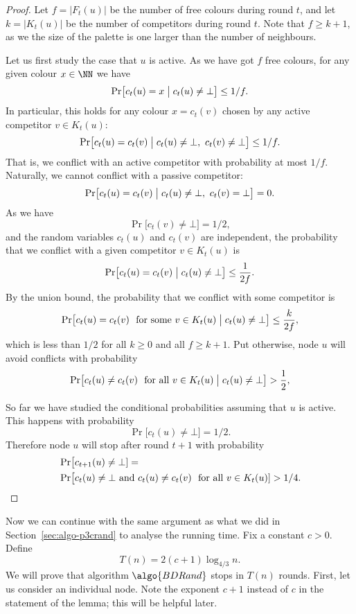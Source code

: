 \begin{proof}
    Let $f = |F_t(u)|$ be the number of free colours during round $t$, and let $k = |K_t(u)|$ be the number of competitors during round $t$. Note that $f \ge k + 1$, as we the size of the palette is one larger than the number of neighbours.

    Let us first study the case that $u$ is active. As we have got $f$ free colours, for any given colour $x \in \NN$ we have
    \[
        \Pr\bigl[ c_t(u) = x \bigm| c_t(u) \ne \bot \bigr] \le 1/f.
    \]
    In particular, this holds for any colour $x = c_t(v)$ chosen by any active competitor $v \in K_t(u)$:
    \[
        \Pr\bigl[ c_t(u) = c_t(v) \bigm| c_t(u) \ne \bot,\  c_t(v) \ne \bot \bigr] \le 1/f.
    \]
    That is, we conflict with an active competitor with probability at most $1/f$. Naturally, we cannot conflict with a passive competitor:
    \[
        \Pr\bigl[ c_t(u) = c_t(v) \bigm| c_t(u) \ne \bot,\  c_t(v) = \bot \bigr] = 0.
    \]
    As we have
    \[
        \Pr\bigl[ c_t(v) \ne \bot \bigr] = 1/2,
    \]
    and the random variables $c_t(u)$ and $c_t(v)$ are independent, the probability that we conflict with a given competitor $v \in K_t(u)$ is
    \[
        \Pr\bigl[ c_t(u) = c_t(v) \bigm| c_t(u) \ne \bot \bigr] \le \frac{1}{2f}.
    \]
    By the union bound, the probability that we conflict with some competitor is
    \[
        \Pr\bigl[ c_t(u) = c_t(v) \text{ for some $v \in K_t(u)$} \bigm| c_t(u) \ne \bot \bigr] \le \frac{k}{2f},
    \]
    which is less than $1/2$ for all $k \ge 0$ and all $f \ge k+1$. Put otherwise, node $u$ will avoid conflicts with probability
    \[
        \Pr\bigl[ c_t(u) \ne c_t(v) \text{ for all $v \in K_t(u)$} \bigm| c_t(u) \ne \bot \bigr] > \frac{1}{2},
    \]

    So far we have studied the conditional probabilities assuming that $u$ is active. This happens with probability
    \[
        \Pr\bigl[ c_t(u) \ne \bot \bigr] = 1/2.
    \]
    Therefore node $u$ will stop after round $t+1$ with probability
    \[
    \begin{split}
        &\Pr\bigl[ c_{t+1}(u) \ne \bot] = \\
        &\Pr\bigl[ c_t(u) \ne \bot \text { and } c_t(u) \ne c_t(v) \text{ for all $v \in K_t(u)$} ] > 1/4.
        \qedhere
    \end{split}
    \]
\end{proof}

Now we can continue with the same argument as what we did in Section~\ref{sec:algo-p3crand} to analyse the running time. Fix a constant $c > 0$. Define
\[
    T(n) = 2(c+1) \log_{4/3} n.
\]
We will prove that algorithm $\algo{BDRand}$ stops in $T(n)$ rounds. First, let us consider an individual node. Note the exponent $c+1$ instead of $c$ in the statement of the lemma; this will be helpful later.


